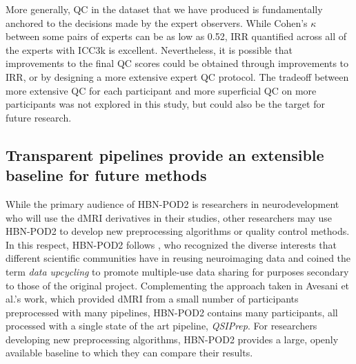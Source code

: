 \documentclass[fleqn,10pt,inline]{wlscirep}
\begin{document}
More generally, QC in the dataset that we have produced is fundamentally
anchored to the decisions made by the expert observers. While Cohen's $\kappa$
between some pairs of experts can be as low as 0.52, IRR quantified across all
of the experts with ICC3k is excellent. Nevertheless, it is possible that
improvements to the final QC scores could be obtained through improvements to
IRR, or by designing a more extensive expert QC protocol. The tradeoff between
more extensive QC for each participant and more superficial QC on more participants was
not explored in this study, but could also be the target for future research.

\subsection*{Transparent pipelines provide an extensible baseline for future methods}

While the primary audience of HBN-POD2 is researchers in neurodevelopment who
will use the dMRI derivatives in their studies, other researchers may use
HBN-POD2 to develop new preprocessing algorithms or quality control methods. In
this respect, HBN-POD2 follows \cite{avesani2019-ey}, who
recognized the diverse interests that different scientific communities have in
reusing neuroimaging data and coined the term \emph{data upcycling} to promote
multiple-use data sharing for purposes secondary to those of the original
project. Complementing the approach taken in Avesani et al.'s work, which
provided dMRI from a small number of participants preprocessed with many pipelines,
HBN-POD2 contains many participants, all processed with a single state of the art
pipeline, \emph{QSIPrep}. For researchers developing new preprocessing
algorithms, HBN-POD2 provides a large, openly available baseline to which they
can compare their results.
\end{document}
